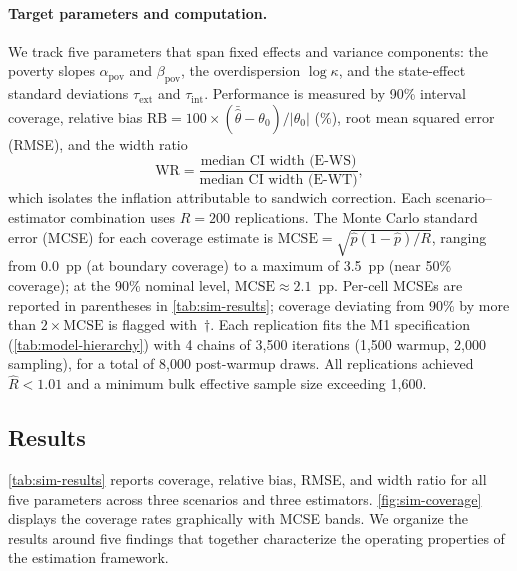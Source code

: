 \paragraph{Target parameters and computation.}
We track five parameters that span fixed effects and variance components:
the poverty slopes $\alpha_{\mathrm{pov}}$ and $\beta_{\mathrm{pov}}$,
the overdispersion $\log\kappa$, and the state-effect standard deviations
$\tau_{\mathrm{ext}}$ and $\tau_{\mathrm{int}}$. Performance is measured
by 90\% interval coverage, relative bias
$\text{RB} = 100 \times (\bar{\hat\theta} - \theta_0)/|\theta_0|$ (\%),
root mean squared error (RMSE), and the width ratio
\[
  \text{WR}
  = \frac{\text{median CI width (E-WS)}}
         {\text{median CI width (E-WT)}},
\]
which isolates the inflation attributable to sandwich correction.
Each scenario--estimator combination uses $R = 200$ replications.
The Monte Carlo standard error (MCSE) for each coverage estimate is
$\mathrm{MCSE} = \sqrt{\hat{p}(1 - \hat{p})/R}$, ranging from 0.0~pp
(at boundary coverage) to a maximum of 3.5~pp (near 50\% coverage);
at the 90\% nominal level, $\mathrm{MCSE} \approx 2.1$~pp.
Per-cell MCSEs are reported in parentheses in \cref{tab:sim-results};
coverage deviating from 90\% by more than $2 \times \mathrm{MCSE}$ is
flagged with~$\dagger$.
Each replication fits the M1 specification
(\cref{tab:model-hierarchy}) with 4 chains of 3{,}500 iterations
(1{,}500 warmup, 2{,}000 sampling), for a total of 8{,}000 post-warmup draws.
All replications achieved $\hat{R} < 1.01$ \citep{Vehtari2021} and a minimum bulk effective
sample size exceeding 1{,}600.


\subsection{Results}\label{sec:simresults}

\cref{tab:sim-results} reports coverage, relative bias, RMSE, and width
ratio for all five parameters across three scenarios and three
estimators. \cref{fig:sim-coverage} displays the coverage rates
graphically with MCSE bands. We organize the results around five
findings that together characterize the operating properties of the
estimation framework.

